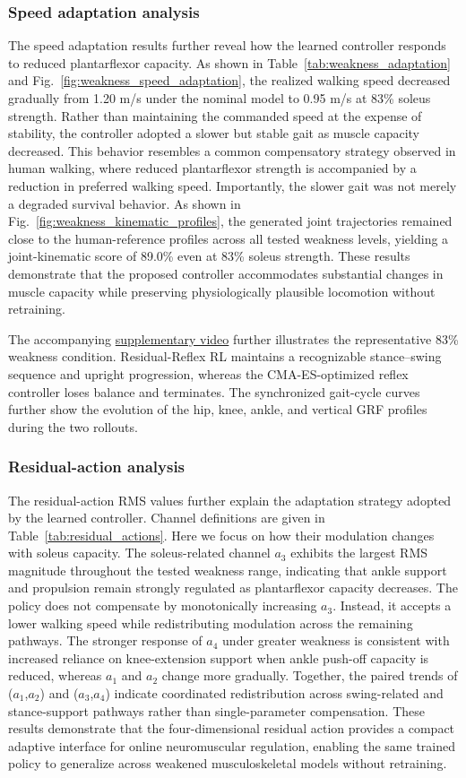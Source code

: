 \documentclass[acmtog,screen]{acmart}
\newcommand{\suppvideo}{\href{https://github.com/zhjccoffee/Supplementary-supporting-video}{supplementary video}}
\begin{document}
\subsubsection{Speed adaptation analysis}
The speed adaptation results further reveal how the learned controller responds to reduced plantarflexor capacity. As shown in
Table~\ref{tab:weakness_adaptation} and
Fig.~\ref{fig:weakness_speed_adaptation}, the realized walking speed decreased gradually from 1.20 m/s under the nominal model to 0.95 m/s at 83\% soleus strength. Rather than maintaining the commanded speed at the expense of stability, the controller adopted a slower but stable gait as muscle capacity decreased. This behavior resembles a common compensatory strategy observed in human walking, where reduced plantarflexor strength is accompanied by a reduction in preferred walking speed. Importantly, the slower gait was not merely a degraded survival behavior. As shown in Fig.~\ref{fig:weakness_kinematic_profiles}, the generated joint trajectories remained close to the human-reference profiles across all tested weakness levels, yielding a joint-kinematic score of 89.0\% even at 83\% soleus strength. These results demonstrate that the proposed controller accommodates substantial changes in muscle capacity while preserving physiologically plausible locomotion without retraining.

The accompanying \suppvideo{} further illustrates the representative 83\% weakness condition. Residual-Reflex RL maintains a recognizable stance--swing sequence and upright progression, whereas the CMA-ES-optimized reflex controller loses balance and terminates. The synchronized gait-cycle curves further show the evolution of the hip, knee, ankle, and vertical GRF profiles during the two rollouts.

\subsubsection{Residual-action analysis}
The residual-action RMS values further explain the adaptation strategy adopted by the learned controller. Channel definitions are given in Table~\ref{tab:residual_actions}. Here we focus on how their modulation changes with soleus capacity. The soleus-related channel $a_3$ exhibits the largest RMS magnitude throughout the tested weakness range, indicating that ankle support and propulsion remain strongly regulated as plantarflexor capacity decreases. The policy does not compensate by monotonically increasing $a_3$. Instead, it accepts a lower walking speed while redistributing modulation across the remaining pathways. The stronger response of $a_4$ under greater weakness is consistent with increased reliance on knee-extension support when ankle push-off capacity is reduced, whereas $a_1$ and $a_2$ change more gradually. Together, the paired trends of ($a_1$,$a_2$) and ($a_3$,$a_4$) indicate coordinated redistribution across swing-related and stance-support pathways rather than single-parameter compensation. These results demonstrate that the four-dimensional residual action provides a compact adaptive interface for online neuromuscular regulation, enabling the same trained policy to generalize across weakened musculoskeletal models without retraining.
\end{document}
